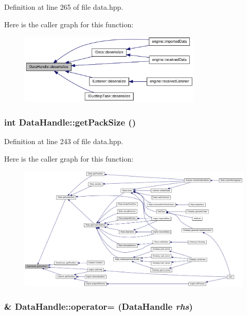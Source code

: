 Definition at line 265 of file data.hpp.

Here is the caller graph for this function:\nopagebreak
\begin{figure}[H]
\begin{center}
\leavevmode
\includegraphics[width=246pt]{struct_data_handle_a4abd5569c8a2cb0ff6fdca749765aa70_icgraph}
\end{center}
\end{figure}
\hypertarget{struct_data_handle_a5f555e8f89e12b36a6f831059fb10124}{
\subsubsection[{getPackSize}]{\setlength{\rightskip}{0pt plus 5cm}int DataHandle::getPackSize ()}}
\label{struct_data_handle_a5f555e8f89e12b36a6f831059fb10124}


Definition at line 243 of file data.hpp.

Here is the caller graph for this function:\nopagebreak
\begin{figure}[H]
\begin{center}
\leavevmode
\includegraphics[width=420pt]{struct_data_handle_a5f555e8f89e12b36a6f831059fb10124_icgraph}
\end{center}
\end{figure}
\hypertarget{struct_data_handle_a5fd92766a9d2d0de3a6ad1b0461b7bea}{
\subsubsection[{operator=}]{\& DataHandle::operator= ({\bf DataHandle} {\em rhs})}}
\label{struct_data_handle_a5fd92766a9d2d0de3a6ad1b0461b7bea}


